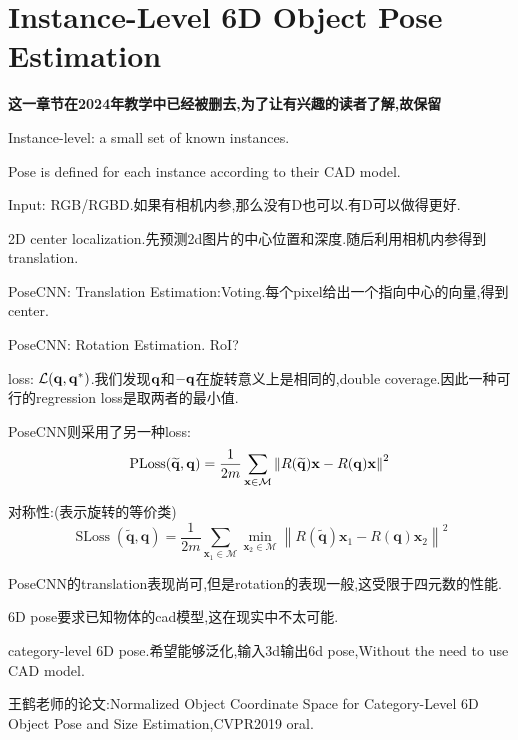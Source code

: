 \chapter{Instance-Level 6D Object Pose Estimation}

\textbf{这一章节在2024年教学中已经被删去,为了让有兴趣的读者了解,故保留}

Instance-level: a small set of known instances.

Pose is defined for each instance according to their CAD model.

Input: RGB/RGBD.如果有相机内参,那么没有D也可以.有D可以做得更好.

2D center localization.先预测2d图片的中心位置和深度.随后利用相机内参得到translation.

PoseCNN: Translation Estimation:Voting.每个pixel给出一个指向中心的向量,得到center.

PoseCNN: Rotation Estimation. RoI?

loss: $\mathcal{L}(\bold{q}, \bold{q}^{*})$.我们发现$\bold{q}$和$-\bold{q}$在旋转意义上是相同的,double coverage.因此一种可行的regression loss是取两者的最小值.

PoseCNN则采用了另一种loss:
\begin{equation}
   \mathrm{PLoss}(\widetilde{\bold{q}}, \bold{q}) = \frac{1}{2m}\sum_{\bold{x} \in \mathcal{M}} \left \Vert R(\widetilde{\bold{q}}) \bold{x} - R(\bold{q}) \bold{x} \right \Vert^2
\end{equation}

对称性:(表示旋转的等价类)
\begin{equation}
   \operatorname{SLoss}(\widetilde{\mathbf{q}}, \mathbf{q})=\frac{1}{2 m} \sum_{\mathbf{x}_{1} \in \mathcal{M}} \min _{\mathbf{x}_{2} \in \mathcal{M}}\left\|R(\tilde{\mathbf{q}}) \mathbf{x}_{1}-R(\mathbf{q}) \mathbf{x}_{2}\right\|^{2}
\end{equation}

PoseCNN的translation表现尚可,但是rotation的表现一般,这受限于四元数的性能.

6D pose要求已知物体的cad模型,这在现实中不太可能.

category-level 6D pose.希望能够泛化,输入3d输出6d pose,Without the need to use CAD model.

王鹤老师的论文:Normalized Object Coordinate Space for Category-Level 6D Object Pose and Size Estimation,CVPR2019 oral.


